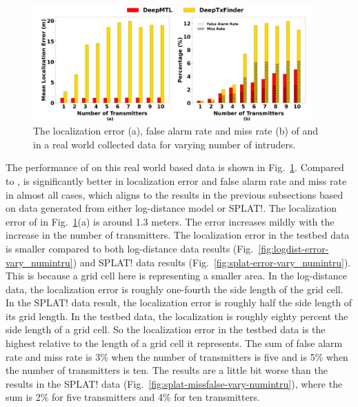 \begin{figure}
    \centering
    \includegraphics[width=0.95\textwidth]{chapters/wowmom-pmc/figures/ipsn_testbed-error_false_miss_vary_numintru.png}
    \vspace{-0.1in}
    \caption{The localization error (a), false alarm rate and miss rate (b) of \our and \deeptx in a real world collected data for varying number of intruders.}
    \label{fig:ipsn}
\end{figure}

The performance of \our on this real world based data is shown in Fig.~\ref{fig:ipsn}.
Compared to \deeptx, \our is significantly better in localization error and false alarm rate and miss rate in almost all cases, which aligns to the results in the previous subsections based on data generated from either log-distance model or SPLAT!.
The localization error of \our in Fig.~\ref{fig:ipsn}(a) is around 1.3 meters.
The error increases mildly with the increase in the number of transmitters.
The localization error in the testbed data is smaller compared to both log-distance data results (Fig.~\ref{fig:logdist-error-vary_numintru}) and SPLAT! data results (Fig.~\ref{fig:splat-error-vary_numintru}).
This is because a grid cell here is representing a smaller area.
In the log-distance data, the localization error is roughly one-fourth the side length of the grid cell. 
In the SPLAT! data result, the localization error is roughly half the side length of its grid length.
In the testbed data, the localization is roughly eighty percent the side length of a grid cell.
So the localization error in the testbed data is the highest relative to the length of a grid cell it represents.
The sum of false alarm rate and miss rate is 3\% when the number of transmitters is five and is 5\% when the number of transmitters is ten.
The results are a little bit worse than the results in the SPLAT! data (Fig.~\ref{fig:splat-missfalse-vary-numintru}), where the sum is 2\% for five transmitters and 4\% for ten transmitters.

